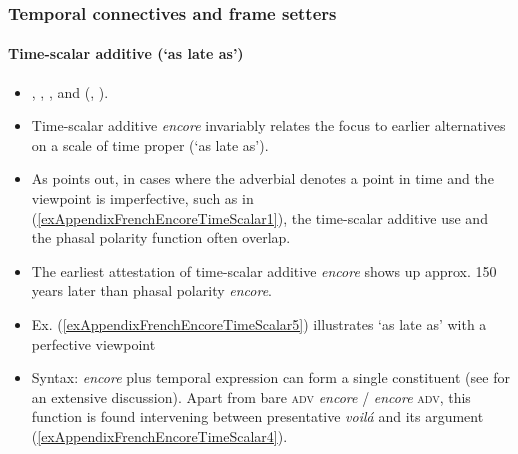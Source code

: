 \subsubsection{Temporal connectives and frame setters}
\paragraph{Time-scalar additive (\lq as late as\rq)}
\label{appendixFrenchEncoreTimeScalar}
\begin{itemize}
	\item \textcite{Borillo1984}, \textcite{Fuchs1993}, \textcite[161–162]{MosegaardHansen2008} , \textcite{Nef1981} and \citeauthor{VictorriFuchs1992} (\citeyear{VictorriFuchs1992}, \citeyear{VictorriFuchs1996}).
	\item Time-scalar additive \textit{encore} invariably relates the focus to earlier alternatives on a scale of time proper (\lq as late as').
	\item As \textcite[162]{MosegaardHansen2008} points out, in cases where the adverbial denotes a point in time and the viewpoint is imperfective, such as in (\ref{exAppendixFrenchEncoreTimeScalar1}), the time-scalar additive use and the phasal polarity function often overlap.
	\item The earliest attestation of time-scalar additive \textit{encore} shows up approx. 150 years later than phasal polarity \textit{encore}.
\item Ex. (\ref{exAppendixFrenchEncoreTimeScalar5}) illustrates \lq as late as\rq{ }with a perfective viewpoint
		\item Syntax: \textit{encore} plus temporal expression can form a single constituent (see \cite{Fuchs1993} for an extensive discussion). Apart from bare \textsc{adv} \textit{encore} / \textit{encore} \textsc{adv}, this function is found intervening between presentative \textit{voilá} and its argument (\ref{exAppendixFrenchEncoreTimeScalar4}).
\end{itemize}

